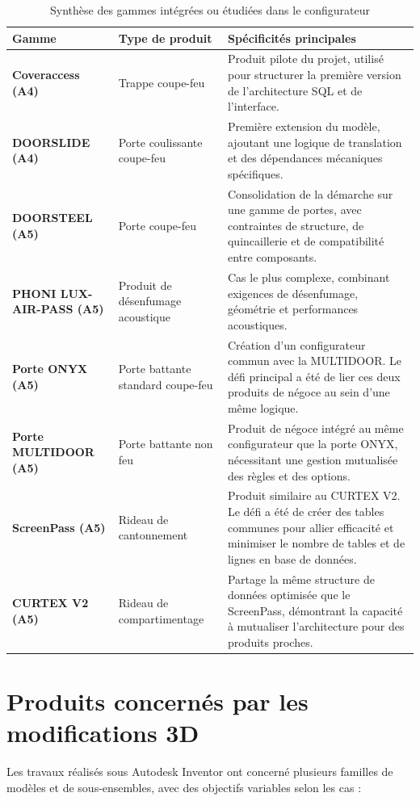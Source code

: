 \begin{table}[H]
\centering
\caption{Synthèse des gammes intégrées ou étudiées dans le configurateur}
{\small
\begin{tabularx}{\textwidth}{>{\bfseries}p{} p{} X}
\toprule
Gamme &  Type de produit & Spécificités principales \\
\midrule
Coveraccess (A4) & Trappe coupe-feu & Produit pilote du projet, utilisé pour structurer la première version de l'architecture SQL et de l'interface. \\
DOORSLIDE (A4) & Porte coulissante coupe-feu & Première extension du modèle, ajoutant une logique de translation et des dépendances mécaniques spécifiques. \\
DOORSTEEL (A5) & Porte coupe-feu & Consolidation de la démarche sur une gamme de portes, avec contraintes de structure, de quincaillerie et de compatibilité entre composants. \\
PHONI LUX-AIR-PASS (A5) & Produit de désenfumage acoustique & Cas le plus complexe, combinant exigences de désenfumage, géométrie et performances acoustiques. \\
Porte ONYX (A5) & Porte battante standard coupe-feu & Création d'un configurateur commun avec la MULTIDOOR. Le défi principal a été de lier ces deux produits de négoce au sein d'une même logique. \\
Porte MULTIDOOR (A5) & Porte battante non feu & Produit de négoce intégré au même configurateur que la porte ONYX, nécessitant une gestion mutualisée des règles et des options. \\
ScreenPass (A5) & Rideau de cantonnement & Produit similaire au CURTEX V2. Le défi a été de créer des tables communes pour allier efficacité et minimiser le nombre de tables et de lignes en base de données. \\
CURTEX V2 (A5) & Rideau de compartimentage & Partage la même structure de données optimisée que le ScreenPass, démontrant la capacité à mutualiser l'architecture pour des produits proches. \\
\bottomrule
\end{tabularx}}
\end{table}

\chapter{Produits concernés par les modifications 3D}

Les travaux réalisés sous Autodesk Inventor ont concerné plusieurs familles de modèles et de sous-ensembles, avec des objectifs variables selon les cas :

